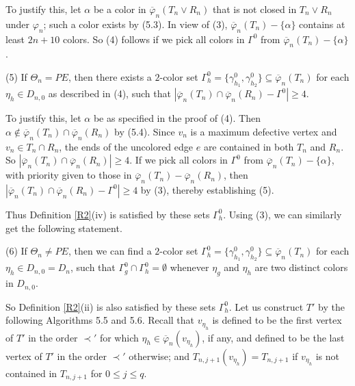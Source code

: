 \documentclass[11pt]{article}
\newcommand{\phibar}{\overline{\varphi}}
\begin{document}
To justify this, let $\alpha$ be a color in $\overline{\varphi}_n(T_n \vee R_n)$ that is not closed in $T_n \vee R_n$
under $\varphi_n$; such a color exists by (5.3). In view of (3), $\overline{\varphi}_n(T_n)-\{\alpha\}$ 
contains at least $2n+10$ colors. So (4) follows if we pick all colors in $\Gamma^{0}$ from $\overline{\varphi}_n(T_n)-
\{\alpha\}$.  

(5) If $\Theta_n=PE$, then there exists a $2$-color set $\Gamma^{0}_h=\{\gamma^{0}_{h_1},\gamma^{0}_{h_2}\}\subseteq 
\phibar_n(T_{n})$ for each $\eta_h\in D_{n,0}$ as described in (4), such that $|\phibar_n(T_n) \cap \phibar_n(R_n)-\Gamma^0|\ge 4$. 

To justify this, let $\alpha$ be as specified in the proof of (4). Then $\alpha \notin \overline{\varphi}_n(T_n) \cap \overline{\varphi}_n(R_n)$ by (5.4). Since $v_n$ is a maximum defective vertex and $v_n\in T_n\cap R_n$, the ends of the uncolored edge $e$ are contained in both 
$T_n$ and $R_n$. So $|\overline{\varphi}_n(T_n) \cap \overline{\varphi}_n(R_n)|\geq 4$.  If we pick all colors in $\Gamma^{0}$ from $\overline{\varphi}_n(T_n)-\{\alpha\}$, 
with priority given to those in $\overline{\varphi}_n(T_n)-\overline{\varphi}_n(R_n)$, then $|\overline{\varphi}_n(T_n) \cap \overline{\varphi}_n(R_n) -\Gamma^0| \ge 4$ 
by (3), thereby establishing (5).

Thus Definition \ref{R2}(iv) is satisfied by these sets $\Gamma^{0}_h$. Using (3), we can similarly get 
the following statement. 

(6) If $\Theta_n \ne PE$, then we can find a $2$-color set $\Gamma^{0}_h=\{\gamma^{0}_{h_1},\gamma^{0}_{h_2}\}\subseteq 
\phibar_n(T_{n})$ for each $\eta_h\in D_{n,0}=D_n$, such that $\Gamma^{0}_{g} \cap \Gamma^{0}_{h}=\emptyset$ whenever 
$\eta_{g}$ and $\eta_{h}$ are two distinct colors in $D_{n,0}$.

So Definition \ref{R2}(ii) is also satisfied by these sets $\Gamma^{0}_h$.
Let us construct $T'$ by the following Algorithms 5.5 and 5.6. Recall that   
$v_{\eta_h}$ is defined to be the first vertex of $T'$ in the order $\prec'$ for which $\eta_h \in 
\phibar_n (v_{\eta_h})$, if any, and defined to be the last vertex of $T'$ in the order $\prec'$ otherwise;
and $T_{n,j+1}(v_{\eta_h})=T_{n,j+1}$ if $v_{\eta_h}$ is not contained in $T_{n,j+1}$ for $0\le j \le q$.
\end{document}
